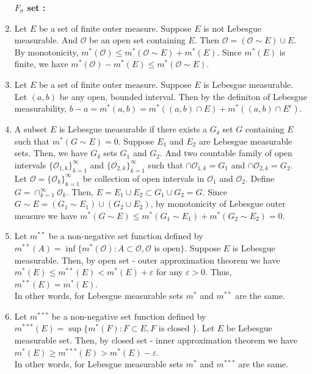 \begin{enumerate}
	\textbf{$F_\sigma$ set : }
\item
 	Let $E$ be a set of finite outer measure.
	Suppose $E$ is not Lebesgue measurable.
	And $\mathcal{O}$ be an open set containing $E$.
	Then $\mathcal{O} = (\mathcal{O} \sim E) \cup E$.
		By monotonicity, $m^\ast(\mathcal{O}) \le m^\ast(\mathcal{O} \sim E) + m^\ast(E)$.
	Since $m^\ast(E)$ is finite, we have $m^\ast(\mathcal{O}) - m^\ast(E) \le m^\ast(\mathcal{O} \sim E)$.
\item  Let $E$ be a set of finite outer measure.
	Suppose $E$ is Lebesgue measurable.
	Let $(a,b)$ be any open, bounded interval.
	Then by the definiton of Lebesgue measurability, $b-a = m^\ast(a,b) = m^\ast((a,b) \cap E) + m^\ast((a,b) \cap E^c)$.
\item  
 	A subset $E$ is Lebesgue measurable if there exists a $G_\delta$ set $G$ containing $E$ such that $m^\ast(G \sim E) = 0$.
	Suppose $E_1$ and $E_2$ are Lebesgue measurable sets.	
	Then, we have $G_\delta$ sets $G_1$ and $G_2$.
	And two countable family of open intervals $\{\mathcal{O}_{1,k}\}_{k=1}^\infty$ and $\{ \mathcal{O}_{2,k}\}_{k=1}^\infty$ such that $\cap \mathcal{O}_{1,k} = G_1$ and $\cap \mathcal{O}_{2,k} = G_2$.
	Let $\mathcal{O} = \{ \mathcal{O}_k \}_{k=1}^\infty$ be collection of open intervals in $\mathcal{O}_1$ and $\mathcal{O}_2$.
	Define $G = \cap_{k=1}^\infty \mathcal{O}_k$.
	Then, $E = E_1 \cup E_2 \subset G_1 \cup G_2 = G$.
	Since $G \sim E = (G_1 \sim E_1) \cup (G_2 \cup E_2)$, by monotonicity of Lebesgue outer measure we have $m^\ast(G \sim E) \le m^\ast(G_1 \sim E_1) + m^\ast(G_2 \sim E_2) = 0$.
\item
	Let $m^{\ast\ast}$ be a non-negative set function defined by $m^{\ast\ast}(A) = \inf \{ m^\ast(\mathcal{O}) : A \subset \mathcal{O}, \mathcal{O} \text{ is open} \}$.
	Suppose $E$ is Lebesgue measurable.
	Then, by open set - outer approximation theorem
	we have $m^\ast(E) \le m^{\ast\ast}(E) < m^\ast(E) + \varepsilon$ for any $\varepsilon > 0$.
	Thus, $m^{\ast\ast}(E) = m^\ast(E)$. \\

	In other words, for Lebesgue measurable sets $m^\ast$ and $m^{\ast\ast}$ are the same.
\item  
	Let $m^{\ast\ast\ast}$ be a non-negative set function defined by $m^{\ast\ast\ast}(E) = \sup \{ m^\ast(F) : F \subset E, F \text{ is closed } \}$.
	Let $E$ be Lebesgue measurable set.
	Then, by closed set - inner approximation theorem
	we have $m^\ast(E) \ge m^{\ast\ast\ast}(E) > m^\ast(E)-\varepsilon$.\\

	In other words, for Lebesgue measurable sets $m^\ast$ and $m^{\ast\ast\ast}$ are the same.
\end{enumerate}
